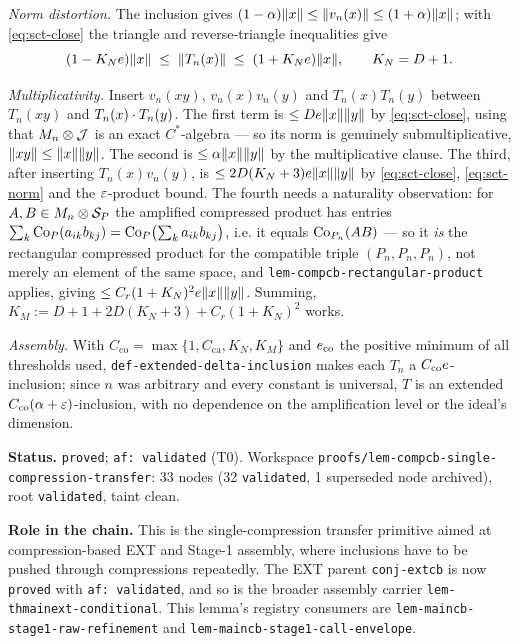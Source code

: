 \emph{Norm distortion.} The inclusion gives
$(1-\alpha)\lVert x\rVert\le\lVert v_n(x)\rVert\le(1+\alpha)\lVert x\rVert$; with \eqref{eq:sct-close} the
triangle and reverse-triangle inequalities give
\begin{equation}\label{eq:sct-norm}
  (1-K_Ne)\lVert x\rVert\;\le\;\lVert T_n(x)\rVert\;\le\;(1+K_Ne)\lVert x\rVert,\qquad K_N=D+1 .
\end{equation}

\emph{Multiplicativity.} Insert $v_n(xy)$, $v_n(x)v_n(y)$ and $T_n(x)T_n(y)$ between
$T_n(xy)$ and $T_n(x)\mathbin{\cdot} T_n(y)$. The first term is $\le De\lVert x\rVert\lVert y\rVert$ by
\eqref{eq:sct-close}, using that $M_{n}\otimes \mathcal J$ is an exact $C^*$-algebra --- so its
norm is genuinely submultiplicative, $\lVert xy\rVert\le\lVert x\rVert\lVert y\rVert$. The second is
$\le\alpha\lVert x\rVert\lVert y\rVert$ by the multiplicative clause. The third, after inserting
$T_n(x)v_n(y)$, is $\le2D(K_N+3)e\lVert x\rVert\lVert y\rVert$ by \eqref{eq:sct-close},
\eqref{eq:sct-norm} and the $\varepsilon$-product bound. The fourth needs a naturality
observation: for $A,B\in M_{n}\otimes \mathcal S_{P}$ the amplified compressed product has entries
$\sum_k\mathrm{Co}_{P}(a_{ik}b_{kj})=\mathrm{Co}_{P}\bigl(\sum_ka_{ik}b_{kj}\bigr)$, i.e. it equals
$\mathrm{Co}_{P_n}(AB)$ --- so it \emph{is} the rectangular compressed product for the compatible
triple $(P_n,P_n,P_n)$, not merely an element of the same space, and
\texttt{lem-compcb-rectangular-product} applies, giving
$\le C_r(1+K_N)^{2}e\lVert x\rVert\lVert y\rVert$. Summing,
$K_M:=D+1+2D(K_N+3)+C_r(1+K_N)^{2}$ works.

\emph{Assembly.} With $C_{\mathrm{co}}=\max\{1,C_{\mathrm{ca}},K_N,K_M\}$ and
$e_{\mathrm{co}}$ the positive minimum of all thresholds used,
\texttt{def-extended-delta-inclusion} makes each $T_n$ a $C_{\mathrm{co}}e$-inclusion;
since $n$ was arbitrary and every constant is universal, $T$ is an extended
$C_{\mathrm{co}}(\alpha+\varepsilon)$-inclusion, with no dependence on the amplification level or
the ideal's dimension.

\medskip
\noindent\textbf{Status.} \texttt{proved}; \texttt{af: validated} (T0). Workspace
\texttt{proofs/lem-compcb-single-compression-transfer}: 33 nodes (32 \texttt{validated}, 1
superseded node archived), root \texttt{validated}, taint clean.

\noindent\textbf{Role in the chain.} This is the single-compression transfer primitive aimed at compression-based
EXT and Stage-1 assembly, where inclusions have to be pushed through
compressions repeatedly.  The EXT parent \texttt{conj-extcb} is now
\texttt{proved} with \texttt{af: validated}, and so is the broader assembly carrier
\texttt{lem-thmainext-conditional}.  This lemma's registry consumers are
\texttt{lem-maincb-stage1-raw-refinement} and \texttt{lem-maincb-stage1-call-envelope}.
